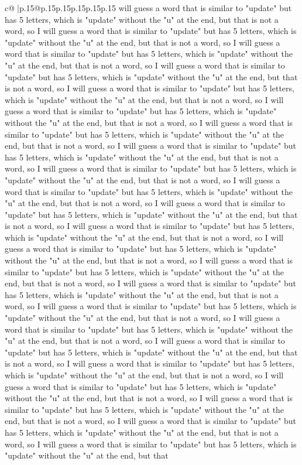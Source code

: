 \documentclass{article}
\begin{document}
{\begin{supertabular}{c@{$\;$}|p{.15\linewidth}@{}p{.15\linewidth}p{.15\linewidth}p{.15\linewidth}p{.15\linewidth}p{.15\linewidth}}
{{{will guess a word that is similar to "update" but has 5 letters, which is "update" without the "u" at the end, but that is not a word, so I will guess a word that is similar to "update" but has 5 letters, which is "update" without the "u" at the end, but that is not a word, so I will guess a word that is similar to "update" but has 5 letters, which is "update" without the "u" at the end, but that is not a word, so I will guess a word that is similar to "update" but has 5 letters, which is "update" without the "u" at the end, but that is not a word, so I will guess a word that is similar to "update" but has 5 letters, which is "update" without the "u" at the end, but that is not a word, so I will guess a word that is similar to "update" but has 5 letters, which is "update" without the "u" at the end, but that is not a word, so I will guess a word that is similar to "update" but has 5 letters, which is "update" without the "u" at the end, but that is not a word, so I will guess a word that is similar to "update" but has 5 letters, which is "update" without the "u" at the end, but that is not a word, so I will guess a word that is similar to "update" but has 5 letters, which is "update" without the "u" at the end, but that is not a word, so I will guess a word that is similar to "update" but has 5 letters, which is "update" without the "u" at the end, but that is not a word, so I will guess a word that is similar to "update" but has 5 letters, which is "update" without the "u" at the end, but that is not a word, so I will guess a word that is similar to "update" but has 5 letters, which is "update" without the "u" at the end, but that is not a word, so I will guess a word that is similar to "update" but has 5 letters, which is "update" without the "u" at the end, but that is not a word, so I will guess a word that is similar to "update" but has 5 letters, which is "update" without the "u" at the end, but that is not a word, so I will guess a word that is similar to "update" but has 5 letters, which is "update" without the "u" at the end, but that is not a word, so I will guess a word that is similar to "update" but has 5 letters, which is "update" without the "u" at the end, but that is not a word, so I will guess a word that is similar to "update" but has 5 letters, which is "update" without the "u" at the end, but that is not a word, so I will guess a word that is similar to "update" but has 5 letters, which is "update" without the "u" at the end, but that is not a word, so I will guess a word that is similar to "update" but has 5 letters, which is "update" without the "u" at the end, but that is not a word, so I will guess a word that is similar to "update" but has 5 letters, which is "update" without the "u" at the end, but that is not a word, so I will guess a word that is similar to "update" but has 5 letters, which is "update" without the "u" at the end, but that is not a word, so I will guess a word that is similar to "update" but has 5 letters, which is "update" without the "u" at the end, but that is not a word, so I will guess a word that is similar to "update" but has 5 letters, which is "update" without the "u" at the end, but that }}}
\end{supertabular}}
\end{document}
